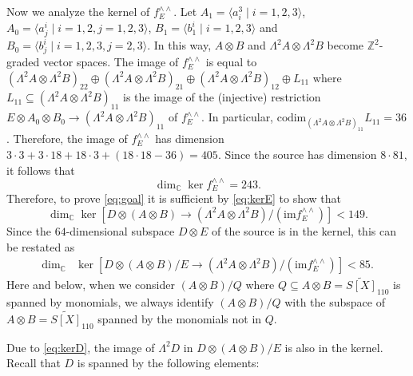 \documentclass[12pt]{amsart}
\theoremstyle{definition}
\theoremstyle{remark}
\theoremstyle{definition}
\newcommand{\CC}{\mathbb{C}}
\begin{document}
Now we analyze the kernel of $f^{\wedge \wedge }_{E}$. Let $A_1 = \langle a^3_i \mid i=1,2,3\rangle$, $A_0 = \langle a^i_j \mid i=1,2, j=1,2,3\rangle$, $B_1 = \langle b^i_1 \mid i=1,2,3\rangle$ and $B_0 = \langle b^i_j \mid i=1,2,3, j=2,3\rangle$. In this way, $A\otimes B$ and $\Lambda^2 A\otimes \Lambda^2 B$ become $\mathbb{Z}^2$-graded vector spaces.
The image of $f^{\wedge \wedge }_{E}$ is equal to $(\Lambda^2A \otimes \Lambda^2 B)_{22} \oplus (\Lambda^2 A \otimes \Lambda^2 B)_{21} \oplus (\Lambda^2 A \otimes \Lambda^2 B)_{12} \oplus L_{11}$
where $L_{11}\subseteq (\Lambda^2 A \otimes \Lambda^2 B)_{11}$ is the image of the (injective) restriction $E\otimes A_0\otimes B_0 \to (\Lambda^2 A \otimes \Lambda^2 B)_{11}$ of $f^{\wedge \wedge}_E$. In particular, $\mathrm{codim}_{(\Lambda^2 A \otimes \Lambda^2 B)_{11}} L_{11} = 36$. Therefore, the image of $f^{\wedge \wedge }_{E}$ has dimension $3\cdot 3+3\cdot 18 + 18\cdot 3 + (18\cdot 18 - 36) = 405$.
Since the source has dimension $8\cdot 81$, it follows that 
\begin{equation}\label{eq:kerE}
    \dim_\CC \ker f^{\wedge\wedge}_{E} = 243.
\end{equation}
%
Therefore, to prove \eqref{eq:goal} it is sufficient by \eqref{eq:kerE} to show that
\[
\dim_\CC \ker [D\otimes (A\otimes B)\to (\Lambda^2 A\otimes \Lambda^2B)/(\mathrm{im}f^{\wedge \wedge}_E)] < 149.
\]
Since the $64$-dimensional subspace $D\otimes E$ of the source is in the kernel, this can be restated as 
\begin{align*}
\dim_\CC &\ker [D\otimes (A\otimes B)/E \to (\Lambda^2 A\otimes \Lambda^2B)/(\mathrm{im}f^{\wedge \wedge}_E)]< 85.
\end{align*}
Here and below, when we consider $(A\otimes B)/Q$ where $Q\subseteq A\otimes B = \widetilde{S[X]}_{110}$ is spanned by monomials, we always identify $(A\otimes B)/Q$ with the subspace of $A\otimes B = \widetilde{S[X]}_{110}$ spanned by the monomials not in $Q$.

Due to \eqref{eq:kerD}, the image of $\Lambda^2 D$ in $D\otimes (A\otimes B)/E$ is also in the kernel. 
Recall that $D$ is spanned by the following elements:
\end{document}
